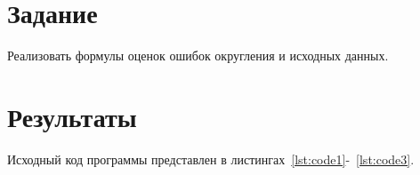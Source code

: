 \documentclass[a4paper, 14pt]{extarticle}
\begin{document}
\renewcommand{\ttdefault}{pcr}

\setlength{\tabcolsep}{3pt}
\newpage
\setcounter{page}{2}

\section{Задание}\label{Sect::task}

Реализовать формулы оценок ошибок округления и исходных данных.

\section{Результаты}\label{Sect::res}

Исходный код программы представлен в листингах~\ref{lst:code1}-~\ref{lst:code3}.
\end{document}
